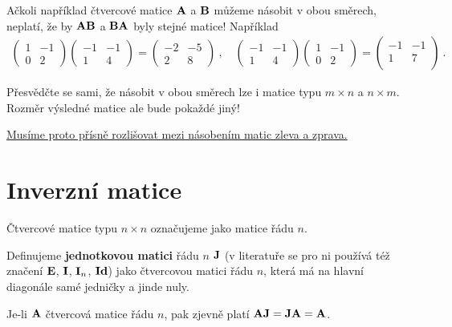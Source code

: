 \begin{example}
    Ačkoli například čtvercové matice $\mathbf{A}$ a $\mathbf{B}$ můžeme násobit v obou směrech, neplatí, že by $\mathbf{A} \mathbf{B}$ a $\mathbf{B} \mathbf{A}$ byly stejné matice!
    Například \begin{align}
        \begin{pmatrix}
            1 & -1 \\
            0 & 2
        \end{pmatrix}
        \begin{pmatrix}
            -1 & -1 \\
            1 & 4
        \end{pmatrix}
        =
        \begin{pmatrix}
            -2 & -5 \\
            2 & 8
        \end{pmatrix} \:, \quad
        \begin{pmatrix}
            -1 & -1 \\
            1 & 4
        \end{pmatrix}
        \begin{pmatrix}
            1 & -1 \\
            0 & 2
        \end{pmatrix}
        =
        \begin{pmatrix}
            -1 & -1\\
            1 & 7\\
        \end{pmatrix} \:.
    \end{align}

    Přesvědčte se sami, že násobit v obou směrech lze i matice typu $m \times n$ a $n \times m$. Rozměr výsledné matice ale bude pokaždé jiný!

    \underline{Musíme proto přísně rozlišovat mezi násobením matic zleva a zprava.}
\end{example}


\section*{Inverzní matice}

Čtvercové matice typu $n \times n$ označujeme jako matice řádu $n$.

Definujeme \textbf{jednotkovou matici} řádu $n$ $\mathbf{J}$ (v literatuře se pro ni používá též značení $\mathbf{E}$, $\mathbf{I}$, $\mathbf{I}_n$, $\mathbf{Id}$) jako čtvercovou matici řádu $n$, která má na hlavní diagonále samé jedničky a jinde nuly.

Je-li $\mathbf{A}$ čtvercová matice řádu $n$, pak zjevně platí $\mathbf{A} \mathbf{J} = \mathbf{J} \mathbf{A} = \mathbf{A}$.